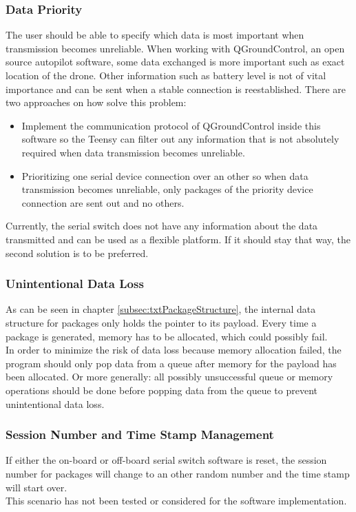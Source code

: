 \subsubsection{Data Priority}
The user should be able to specify which data is most important when transmission becomes unreliable. When working with QGroundControl, an open source autopilot software, some data exchanged is more important such as exact location of the drone. Other information such as battery level is not of vital importance and can be sent when a stable connection is reestablished. There are two approaches on how solve this problem:
\begin{itemize}
    \item Implement the communication protocol of QGroundControl inside this software so the Teensy can filter out any information that is not absolutely required when data transmission becomes unreliable.
    \item Prioritizing one serial device connection over an other so when data transmission becomes unreliable, only packages of the priority device connection are sent out and no others.
\end{itemize}
Currently, the serial switch does not have any information about the data transmitted and can be used as a flexible platform. If it should stay that way, the second solution is to be preferred.
%
\subsubsection{Unintentional Data Loss}
As can be seen in chapter \ref{subsec:txtPackageStructure}, the internal data structure for packages only holds the pointer to its payload. Every time a package is generated, memory has to be allocated, which could possibly fail.\\
In order to minimize the risk of data loss because memory allocation failed, the program should only pop data from a queue after memory for the payload has been allocated. Or more generally: all possibly unsuccessful queue or memory operations should be done before popping data from the queue to prevent unintentional data loss.
%
\subsubsection{Session Number and Time Stamp Management}
If either the on-board or off-board serial switch software is reset, the session number for packages will change to an other random number and the time stamp will start over.\\
This scenario has not been tested or considered for the software implementation.\\
%
